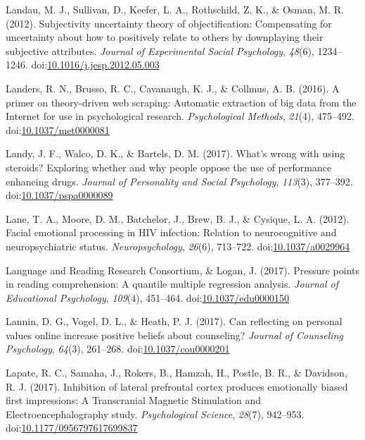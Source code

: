\documentclass[english,man]{apa6}
\begin{document}
\hypertarget{ref-Landau2012}{}
Landau, M. J., Sullivan, D., Keefer, L. A., Rothschild, Z. K., \& Osman,
M. R. (2012). Subjectivity uncertainty theory of objectification:
Compensating for uncertainty about how to positively relate to others by
downplaying their subjective attributes. \emph{Journal of Experimental
Social Psychology}, \emph{48}(6), 1234--1246.
doi:\href{https://doi.org/10.1016/j.jesp.2012.05.003}{10.1016/j.jesp.2012.05.003}

\hypertarget{ref-Landers2016}{}
Landers, R. N., Brusso, R. C., Cavanaugh, K. J., \& Collmus, A. B.
(2016). A primer on theory-driven web scraping: Automatic extraction of
big data from the Internet for use in psychological research.
\emph{Psychological Methods}, \emph{21}(4), 475--492.
doi:\href{https://doi.org/10.1037/met0000081}{10.1037/met0000081}

\hypertarget{ref-Landy2017}{}
Landy, J. F., Walco, D. K., \& Bartels, D. M. (2017). What's wrong with
using steroids? Exploring whether and why people oppose the use of
performance enhancing drugs. \emph{Journal of Personality and Social
Psychology}, \emph{113}(3), 377--392.
doi:\href{https://doi.org/10.1037/pspa0000089}{10.1037/pspa0000089}

\hypertarget{ref-Lane2012}{}
Lane, T. A., Moore, D. M., Batchelor, J., Brew, B. J., \& Cysique, L. A.
(2012). Facial emotional processing in HIV infection: Relation to
neurocognitive and neuropsychiatric status. \emph{Neuropsychology},
\emph{26}(6), 713--722.
doi:\href{https://doi.org/10.1037/a0029964}{10.1037/a0029964}

\hypertarget{ref-LanguageandReadingResearchConsortium2017}{}
Language and Reading Research Consortium, \& Logan, J. (2017). Pressure
points in reading comprehension: A quantile multiple regression
analysis. \emph{Journal of Educational Psychology}, \emph{109}(4),
451--464.
doi:\href{https://doi.org/10.1037/edu0000150}{10.1037/edu0000150}

\hypertarget{ref-Lannin2017}{}
Lannin, D. G., Vogel, D. L., \& Heath, P. J. (2017). Can reflecting on
personal values online increase positive beliefs about counseling?
\emph{Journal of Counseling Psychology}, \emph{64}(3), 261--268.
doi:\href{https://doi.org/10.1037/cou0000201}{10.1037/cou0000201}

\hypertarget{ref-Lapate2017}{}
Lapate, R. C., Samaha, J., Rokers, B., Hamzah, H., Postle, B. R., \&
Davidson, R. J. (2017). Inhibition of lateral prefrontal cortex produces
emotionally biased first impressions: A Transcranial Magnetic
Stimulation and Electroencephalography study. \emph{Psychological
Science}, \emph{28}(7), 942--953.
doi:\href{https://doi.org/10.1177/0956797617699837}{10.1177/0956797617699837}
\end{document}
